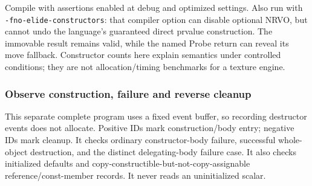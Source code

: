 Compile with assertions enabled at debug and optimized settings. Also run with \texttt{-fno-elide-constructors}: that compiler option can disable optional NRVO, but cannot undo the language's guaranteed direct prvalue construction. The immovable result remains valid, while the named Probe return can reveal its move fallback. Constructor counts here explain semantics under controlled conditions; they are not allocation/timing benchmarks for a texture engine.

\subsubsection{Observe construction, failure and reverse cleanup}\label{observe-construction-failure-and-reverse-cleanup}

This separate complete program uses a fixed event buffer, so recording destructor events does not allocate. Positive IDs mark construction/body entry; negative IDs mark cleanup. It checks ordinary constructor-body failure, successful whole-object destruction, and the distinct delegating-body failure case. It also checks initialized defaults and copy-constructible-but-not-copy-assignable reference/const-member records. It never reads an uninitialized scalar.

